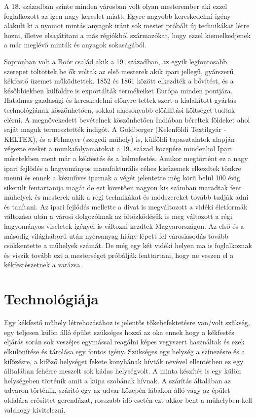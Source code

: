 \documentclass[fontsize=12pt, appendixprefix=true]{scrreprt}
\begin{document}
A 18. században szinte minden városban volt olyan mesterember aki ezzel foglalkozott az igen nagy kereslet miatt. Egyre nagyobb kereskedelmi igény alakult ki a nyomot mintás anyagok iránt sok mester próbált új technikákat létre hozni, illetve  elsajátítani a más régiókból származókat, hogy ezzel kiemelkedjenek a már meglévő minták és anyagok sokaságából.

Sopronban volt a Boór család akik a 19. században, az egyik legfontosabb szerepet töltöttek be ők voltak az első mesterek akik ipari jellegű, gyárszerű  kékfestő üzemet működtettek.
1852 és 1861 között elkezdték a bővítést, és a későbbiekben külföldre is exportálták termékeiket Európa minden pontjára. Hatalmas gazdasági és kereskedelmi előnyre tettek szert a kialakított gyártás technológiának köszönhetően, sokkal alacsonyabb előállítási költséget tudtak elérni. A megnövekedett bevételnek köszönhetően Indiában béreltek földeket ahol saját maguk termesztették indigót.
A Goldberger (Kelenföldi Textilgyár - KELTEX), és a Felmayer (szegedi műhely) is, külföldi tapasztalatok alapján végezte ezeket a  munkafolyamatokat a 19. század közepére mindenhol Ipari méretekben ment már a kékfestés és a kelmefestés.
Amikor megtörtént ez a nagy ipari fejlődés a hagyományos manufakturális céhes kisüzemek elkezdtek tönkre menni és ennek a kézműves iparnak a végét jelentette még körü belül 100 évig sikerült fentartanija magát de ezt követően nagyon kis számban maradtak fent műhelyek és mesterek akik a régi technikákat és módszereket tovább tudják adni és tanítani.
Az ipari fejlődés mellette a divat is megváltozott a vidéki életformák változása után a városi dolgozóknak az öltözködésük is meg változott a régi hagyományos viseletek igényei is változni kezdtek Magyarországon.
Az első és a másodig világháború után nyersanyag hiány lépett fel városiasodás tovább csökkentette a műhelyek számát.
De még egy két vidéki helyen ma is foglalkoznak és viszik tovább ezt a mesterséget próbálják fenttartani, hogy ne veszen el a kékfestészetnek a varázsa.

\section{Technológiája}
Egy kékfestő műhely létrehozásához is jelentős tőkebefektetésre van/volt szűkség, egy teljesen külön álló épület szükséges hozzá az oka ennek hogy a kékfestés eljárás során sok veszéjes egymással reagálni képes vegyszert használtak és ezek elkülönítése és tárolása egy fontos igény. Szükséges egy helység a színezésre és a kifőzésre, a  kifőző helységet fekete konyhának hívták nevével ellentétben ez egy álltalában fehérre meszelt sok kádas helységvolt. A minta készítés is egy külön helységeben történik amit a küpa szobának hívnak. A szárítás általában az udvaron történik, száritó egy az udvar közepén lábakon álló vagy az épület oldalára erősíttet gerendázat, rosszabb idő esetén ezt akkor bent a műhelyben  kell valahogy kivitelezni.
\end{document}
